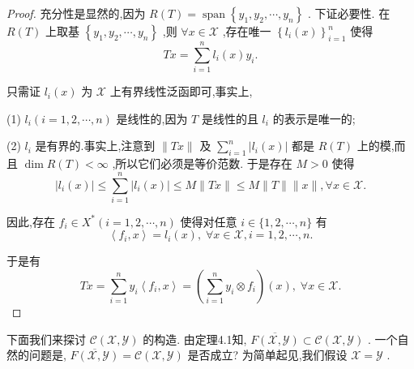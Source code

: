 \documentclass[lang=cn,newtx,10pt,scheme=chinese,thmcnt=chapter]{elegantbook}
\begin{document}
\begin{proof}
    充分性是显然的,因为 \(R\left( T\right)  = \operatorname{span}\left\{  {{y}_{1},{y}_{2},\cdots ,{y}_{n}}\right\}\) . 下证必要性. 在 \(R\left( T\right)\) 上取基 \(\left\{  {{y}_{1},{y}_{2},\cdots ,{y}_{n}}\right\}\) ,则 \(\forall x \in  \mathcal{X}\) ,存在唯一 \({\left\{  {l}_{i}\left( x\right) \right\}  }_{i = 1}^{n}\) 使得
\begin{equation*}
{Tx} = \mathop{\sum }\limits_{{i = 1}}^{n}{l}_{i}\left( x\right) {y}_{i}.
\end{equation*}

只需证 \({l}_{i}\left( x\right)\) 为 \(\mathcal{X}\) 上有界线性泛函即可,事实上,

(1) \({l}_{i}\left( {i = 1,2,\cdots ,n}\right)\) 是线性的,因为 \(T\) 是线性的且 \({l}_{i}\) 的表示是唯一的;

(2) \({l}_{i}\) 是有界的.事实上,注意到 \(\parallel {Tx}\parallel\) 及 \(\mathop{\sum }\limits_{{i = 1}}^{n}\left| {{l}_{i}\left( x\right) }\right|\) 都是 \(R\left( T\right)\) 上的模,而且 \(\dim R\left( T\right)  < \infty\) ,所以它们必须是等价范数. 于是存在 \(M > 0\) 使得
\begin{equation*}
\left| {{l}_{i}\left( x\right) }\right|  \leqslant  \mathop{\sum }\limits_{{i = 1}}^{n}\left| {{l}_{i}\left( x\right) }\right|  \leqslant  M\parallel {Tx}\parallel  \leqslant  M\parallel T\parallel \parallel x\parallel ,\forall x \in  \mathcal{X}.
\end{equation*}

因此,存在 \({f}_{i} \in  {X}^{ * }\left( {i = 1,2,\cdots ,n}\right)\) 使得对任意 \(i \in  \{ 1,2,\cdots ,n\}\) 有
\begin{equation*}
\left\langle  {{f}_{i},x}\right\rangle   = {l}_{i}\left( x\right) ,\;\forall x \in  \mathcal{X},i = 1,2,\cdots ,n.
\end{equation*}

于是有
\begin{equation*}
{Tx} = \mathop{\sum }\limits_{{i = 1}}^{n}{y}_{i}\left\langle  {{f}_{i},x}\right\rangle   = \left( {\mathop{\sum }\limits_{{i = 1}}^{n}{y}_{i} \otimes  {f}_{i}}\right) \left( x\right) ,\;\forall x \in  \mathcal{X}.
\end{equation*}


\end{proof}
下面我们来探讨 \(\mathcal{C}\left( {\mathcal{X},\mathcal{Y}}\right)\) 的构造. 由定理4.1知, \(\overline{F\left( {\mathcal{X},\mathcal{Y}}\right) } \subset  \mathcal{C}\left( {\mathcal{X},\mathcal{Y}}\right)\) . 一个自然的问题是, \(\overline{F\left( {\mathcal{X},\mathcal{Y}}\right) } = \mathcal{C}\left( {\mathcal{X},\mathcal{Y}}\right)\) 是否成立? 为简单起见,我们假设 \(\mathcal{X} = \mathcal{Y}\) .
\end{document}
